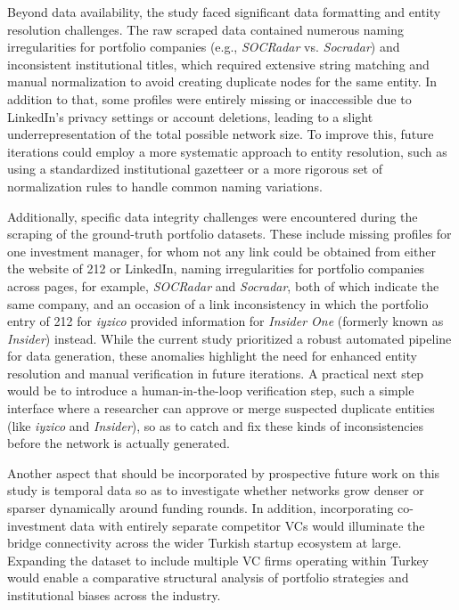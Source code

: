 \documentclass[conference]{IEEEtran}
\begin{document}
Beyond data availability, the study faced significant data formatting and entity resolution challenges. The raw scraped data contained numerous naming irregularities for portfolio companies (e.g., \textit{SOCRadar} vs. \textit{Socradar}) and inconsistent institutional titles, which required extensive string matching and manual normalization to avoid creating duplicate nodes for the same entity. In addition to that, some profiles were entirely missing or inaccessible due to LinkedIn's privacy settings or account deletions, leading to a slight underrepresentation of the total possible network size. To improve this, future iterations could employ a more systematic approach to entity resolution, such as using a standardized institutional gazetteer or a more rigorous set of normalization rules to handle common naming variations. 

Additionally, specific data integrity challenges were encountered during the scraping of the ground-truth portfolio datasets. These include missing profiles for one investment manager, for whom not any link could be obtained from either the website of 212 or LinkedIn, naming irregularities for portfolio companies across pages, for example, \emph{SOCRadar} and \emph{Socradar}, both of which indicate the same company, and an occasion of a link inconsistency in which the portfolio entry of 212 for \emph{iyzico} provided information for \emph{Insider One} (formerly known as \emph{Insider}) instead. While the current study prioritized a robust automated pipeline for data generation, these anomalies highlight the need for enhanced entity resolution and manual verification in future iterations. A practical next step would be to introduce a human-in-the-loop verification step, such a simple interface where a researcher can approve or merge suspected duplicate entities (like \textit{iyzico} and \textit{Insider}), so as to catch and fix these kinds of inconsistencies before the network is actually generated.

Another aspect that should be incorporated by prospective future work on this study is temporal data so as to investigate whether networks grow denser or sparser dynamically around funding rounds. In addition, incorporating co-investment data with entirely separate competitor VCs would illuminate the bridge connectivity across the wider Turkish startup ecosystem at large. Expanding the dataset to include multiple VC firms operating within Turkey would enable a comparative structural analysis of portfolio strategies and institutional biases across the industry.
\end{document}
